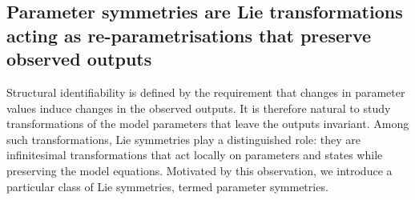 \documentclass[12pt]{article}
\begin{document}

\subsection{Parameter symmetries are Lie transformations acting as re-parametrisations that preserve observed outputs}

 

Structural identifiability is defined by the requirement that changes in parameter values induce changes in the observed outputs. It is therefore natural to study transformations of the model parameters that leave the outputs invariant. Among such transformations, Lie symmetries play a distinguished role: they are infinitesimal transformations that act locally on parameters and states while preserving the model equations. Motivated by this observation, we introduce a particular class of Lie symmetries, termed parameter symmetries.
\end{document}
